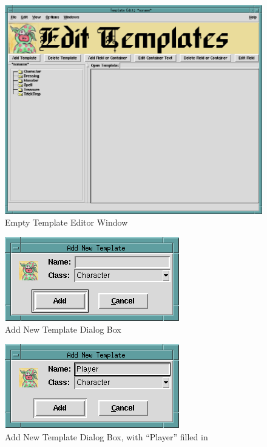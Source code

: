 \begin{figure}[hbpt]
\begin{centering}
\includegraphics[width=5in]{EmptyTemplateEditor.png}
\caption{Empty Template Editor Window}
\label{fig:emptytemplate}
\end{centering}
\end{figure}
\begin{figure}[hbpt]
\begin{centering}
\includegraphics{AddNewTemplate.png}
\caption{Add New Template Dialog Box}
\label{fig:addnewtemplate}
\end{centering}
\end{figure}
\begin{figure}[hbpt]
\begin{centering}
\includegraphics{AddNewTemplatePlayer.png}
\caption{Add New Template Dialog Box, with ``Player'' filled in}
\label{fig:addnewtemplateplayer}
\end{centering}
\end{figure}
